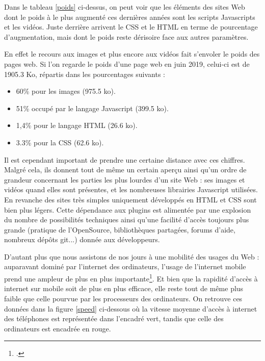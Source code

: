 \documentclass[a4paper,12pt,twoside]{book}
\begin{document}
Dans le tableau \ref{poids} ci-dessus, on peut voir que les éléments des sites Web dont le poids à le plus augmenté ces dernières années sont les scripts Javascripts et les vidéos. Juste derrière arrivent le CSS et le HTML en terme de pourcentage d'augmentation, mais dont le poids reste dérisoire face aux autres paramètres.

En effet le recours aux images et plus encore aux vidéos fait s'envoler le poids des pages web. Si l'on regarde le poids d'une page web en juin 2019, celui-ci est de 1905.3 Ko, répartis dans les pourcentages suivants :
\begin{itemize}
    \item 60\% pour les images (975.5 ko).
    \item 51\% occupé par le langage Javascript (399.5 ko).
    \item 1,4\% pour le langage \acrshort{HTML} (26.6 ko).
    \item 3.3\% pour la \acrshort{CSS} (62.6 ko).
\end{itemize}

Il est cependant important de prendre une certaine distance avec ces chiffres. Malgré cela, ils donnent tout de même un certain aperçu ainsi qu'un ordre de grandeur concernant les parties les plus lourdes d'un site Web : ses images et vidéos quand elles sont présentes, et les nombreuses librairies Javascript utilisées. En revanche des sites très simples uniquement développés en \acrshort{HTML} et \acrshort{CSS} sont bien plus légers. Cette dépendance aux plugins est alimentée par une explosion du nombre de possibilités techniques ainsi qu'une facilité d'accès toujours plus grande (pratique de l'OpenSource, bibliothèques partagées, forums d'aide, nombreux dépôts git...) donnée aux développeurs.

D'autant plus que nous assistons de nos jours à une mobilité des usages du Web : auparavant dominé par l'internet des ordinateurs, l'usage de l'internet mobile prend une ampleur de plus en plus importante\footcite{digital}. Et bien que la rapidité d'accès à internet sur mobile soit de plus en plus efficace, elle reste tout de même plus faible que celle pourvue par les processeurs des ordinateurs. On retrouve ces données dans la figure \ref{speed} ci-dessous où la vitesse moyenne d'accès à internet des téléphones est représentée dans l'encadré vert, tandis que celle des ordinateurs est encadrée en rouge.
\end{document}
